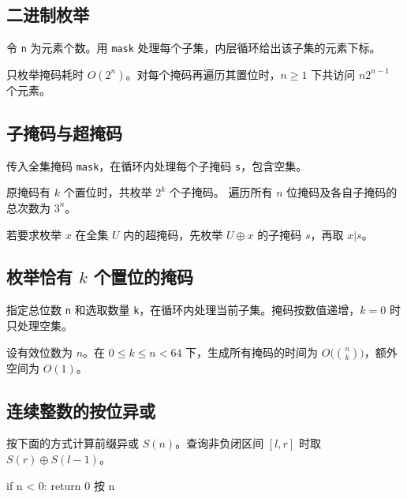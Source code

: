 \subsection{二进制枚举}

令 \texttt{n} 为元素个数。用 \texttt{mask} 处理每个子集，内层循环给出该子集的元素下标。


只枚举掩码耗时 $O(2^n)$。对每个掩码再遍历其置位时，$n\ge 1$ 下共访问 $n2^{n-1}$ 个元素。

\subsection{子掩码与超掩码}

传入全集掩码 \texttt{mask}，在循环内处理每个子掩码 \texttt{s}，包含空集。


原掩码有 $k$ 个置位时，共枚举 $2^k$ 个子掩码。
遍历所有 $n$ 位掩码及各自子掩码的总次数为 $3^n$。

若要求枚举 $x$ 在全集 $U$ 内的超掩码，先枚举 $U\oplus x$ 的子掩码 $s$，再取 $x\mathbin{\mathtt{|}}s$。

\subsection{枚举恰有 $k$ 个置位的掩码}

指定总位数 \texttt{n} 和选取数量 \texttt{k}，在循环内处理当前子集。掩码按数值递增，$k=0$ 时只处理空集。


设有效位数为 $n$。在 $0\le k\le n<64$ 下，生成所有掩码的时间为 $O\bigl(\binom nk\bigr)$，额外空间为 $O(1)$。


\subsection{连续整数的按位异或}

按下面的方式计算前缀异或 $S(n)$。查询非负闭区间 $[l,r]$ 时取 $S(r)\oplus S(l-1)$。

\begin{pseudocode}
if n < 0: return 0
按 n %
\end{pseudocode}
